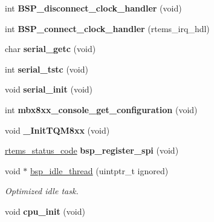 \begin{DoxyCompactItemize}
int {\bfseries B\+S\+P\+\_\+disconnect\+\_\+clock\+\_\+handler} (void)
\item 
\mbox{\label{group__RTEMSBSPsPowerPCTQM8XX_ga599cfd44397bd0b9cc32fee779692d22}} 
int {\bfseries B\+S\+P\+\_\+connect\+\_\+clock\+\_\+handler} (rtems\+\_\+irq\+\_\+hdl)
\item 
\mbox{\label{group__RTEMSBSPsPowerPCTQM8XX_ga39cac08164ba66cb0d3cc151ad25d69e}} 
char {\bfseries serial\+\_\+getc} (void)
\item 
\mbox{\label{group__RTEMSBSPsPowerPCTQM8XX_gad35e7510023ead2cdd1089c3a94dae38}} 
int {\bfseries serial\+\_\+tstc} (void)
\item 
\mbox{\label{group__RTEMSBSPsPowerPCTQM8XX_gad2b461e9e9044364a28a61cfadcacdd8}} 
void {\bfseries serial\+\_\+init} (void)
\item 
\mbox{\label{group__RTEMSBSPsPowerPCTQM8XX_gaf263dd0a3978e2b8bc5dd00a102eb1fb}} 
int {\bfseries mbx8xx\+\_\+console\+\_\+get\+\_\+configuration} (void)
\item 
\mbox{\label{group__RTEMSBSPsPowerPCTQM8XX_gaca92747603893c8e9bab0b641e5f63cc}} 
void {\bfseries \+\_\+\+Init\+T\+Q\+M8xx} (void)
\item 
\mbox{\label{group__RTEMSBSPsPowerPCTQM8XX_ga98f0443fb8880a53f25c0f99ba9aa981}} 
\mbox{\hyperlink{group__ClassicStatus_ga545d41846817eaba6143d52ee4d9e9fe}{rtems\+\_\+status\+\_\+code}} {\bfseries bsp\+\_\+register\+\_\+spi} (void)
\item 
void $\ast$ \mbox{\hyperlink{group__RTEMSBSPsPowerPCTQM8XX_ga301be7085b80c41a9c5887247003c662}{bsp\+\_\+idle\+\_\+thread}} (uintptr\+\_\+t ignored)
\begin{DoxyCompactList}\small\item\em Optimized idle task. \end{DoxyCompactList}\item 
\mbox{\label{group__RTEMSBSPsPowerPCTQM8XX_ga560ad8614ae03841a10b489f4370bc51}} 
void {\bfseries cpu\+\_\+init} (void)
\end{DoxyCompactItemize}
